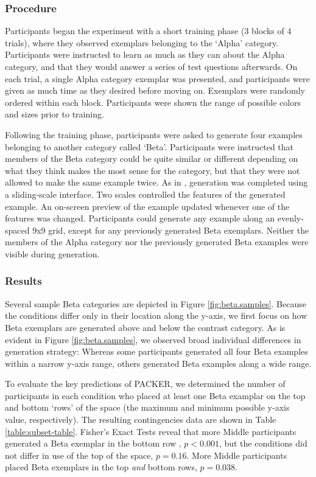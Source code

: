 \documentclass[10pt,letterpaper]{article}
\begin{document}
\subsubsection{Procedure}

Participants began the experiment with a short training phase (3 blocks of 4 trials), where they observed exemplars belonging to the `Alpha' category. Participants were instructed to learn as much as they can about the Alpha category, and that they would answer a series of test questions afterwards. On each trial, a single Alpha category exemplar was presented, and participants were given as much time as they desired before moving on. Exemplars were randomly ordered within each block. Participants were shown the range of possible colors and sizes prior to training.

Following the training phase, participants were asked to generate four examples belonging to another category called `Beta'. Participants were instructed that members of the Beta category could be quite similar or different depending on what they think makes the most sense for the category, but that they were not allowed to make the same example twice. As in \citet{jern2013probabilistic}, generation was completed using a sliding-scale interface. Two scales controlled the features of the generated example. An on-screen preview of the example updated whenever one of the features was changed. Participants could generate any example along an evenly-spaced 9x9 grid, except for any previously generated Beta exemplars. Neither the members of the Alpha category nor the previously generated Beta examples were visible during generation. 

\subsubsection{Results}

Several sample Beta categories are depicted in Figure \ref{fig:beta.samples}. Because the conditions differ only in their location along the y-axis, we first focus on how Beta exemplars are generated above and below the contrast category. As is evident in Figure \ref{fig:beta.samples}, we observed broad individual differences in generation strategy: Whereas some participants generated all four Beta examples within a narrow y-axis range, others generated Beta examples along a wide range. 

To evaluate the key predictions of PACKER, we determined the number of participants in each condition who placed at least one Beta examplar on the top and bottom `rows' of the space (the maximum and minimum possible y-axis value, respectively). The resulting contingencies data are shown in Table \ref{table:subset-table}. Fisher's Exact Tests reveal that more Middle participants generated a Beta exemplar in the bottom row , $p < 0.001$, but the conditions did not differ in use of the top of the space, $p = 0.16$. More Middle participants placed Beta exemplars in the top \textit{and} bottom rows, $p = 0.038$. 
\end{document}
